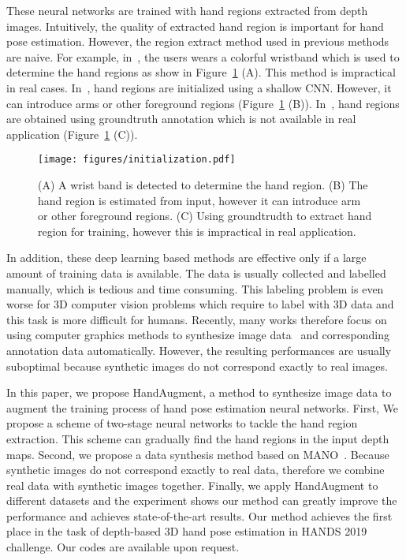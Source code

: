 \documentclass{article}
\begin{document}
These neural networks are trained with hand regions extracted from depth images.
Intuitively, the quality of extracted hand region is important for hand pose estimation. However, the region extract method used in previous methods are naive.
For example, in~\cite{sinha2016deephand}, the users wears a colorful wristband which is used to determine the hand regions as show in Figure~\ref{fig:initialization} (A). This method is impractical in real cases.
In~\cite{chen2019pose}, hand regions are initialized using a shallow CNN. However, it can introduce arms or other foreground regions (Figure~\ref{fig:initialization} (B)). 
In~\cite{wan2018dense}, hand regions are obtained using groundtruth annotation which is not available in real application (Figure~\ref{fig:initialization} (C)).

\begin{figure}[t]
	\centering
	\texttt{[image: figures/initialization.pdf]}
	\caption{(A) A wrist band is detected to determine the hand region. (B) The hand region is estimated from input, however it can introduce arm or other foreground regions. (C) Using groundtrudth to extract hand region for training, however this is impractical in real application.}
	\label{fig:initialization} 
\vspace{-5mm}
\end{figure}

In addition, these deep learning based methods are effective only if a large amount of training data is available. The data is usually collected and labelled manually, which is tedious and time consuming. This labeling problem is even worse for 3D computer vision problems which require to label with 3D data and this task is more difficult for humans. Recently, many works therefore focus on using computer graphics methods to synthesize image data~\cite{rad2018feature} and corresponding annotation data automatically. However, the resulting performances are usually suboptimal because synthetic images do not correspond exactly to real images. 

In this paper, we propose HandAugment, a method to synthesize image data to augment the training process of hand pose estimation neural networks. 
First, We propose a scheme of two-stage neural networks to tackle the hand region extraction. This scheme can gradually find the hand regions in the input depth maps.
Second, we propose a data synthesis method based on MANO~\cite{romero2017embodied}. Because synthetic images do not correspond exactly to real data, therefore we combine real data with synthetic images together.
Finally, we apply HandAugment to different datasets and the experiment shows our method can greatly improve the performance and achieves state-of-the-art results. Our method achieves the first place in the task of depth-based 3D hand pose estimation in HANDS 2019 challenge. Our codes are available upon request.
 
\end{document}
